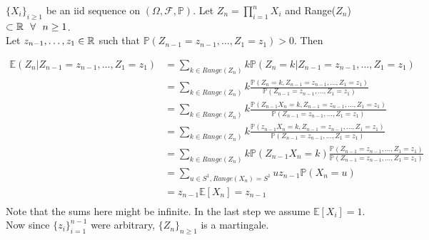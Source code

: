 \documentclass[main]{subfiles}
\begin{document}
\ex $\{X_i\}_{i \geq 1}$ be an iid sequence on $(\Omega, \mathcal{F}, \mathbb{P})$. Let
$Z_n= \prod_{i=1}^n X_i$
and Range($Z_n$) $\subset \mathbb R ~~\forall ~~ n \geq 1$. \\
Let $z_{n-1}, \ldots, z_1 \in \mathbb R$ such that $\mathbb{P} (Z_{n-1}=z_{n-1}, \ldots, Z_1=z_1)>0$. Then

\begin{align*}
  \mathbb{E} (Z_n |Z_{n-1}=z_{n-1}, \ldots, Z_1=z_1) & = \sum_{k \in Range(Z_n)} k \mathbb{P} (Z_n=k |Z_{n-1}=z_{n-1}, \ldots, Z_1=z_1)                                                                           \\
                                                     & = \sum_{k \in Range(Z_n)} k \frac{\mathbb{P} (Z_n=k ,Z_{n-1}=z_{n-1}, \ldots, Z_1=z_1)}{\mathbb{P} (Z_{n-1}=z_{n-1}, \ldots, Z_1=z_1)}                     \\
                                                     & =  \sum_{k \in Range(Z_n)} k \frac{\mathbb{P} (Z_{n-1}X_n=k ,Z_{n-1}=z_{n-1}, \ldots, Z_1=z_1)}{\mathbb{P} (Z_{n-1}=z_{n-1}, \ldots, Z_1=z_1)}             \\
                                                     & =  \sum_{k \in Range(Z_n)} k \frac{\mathbb{P} (z_{n-1}X_n=k ,Z_{n-1}=z_{n-1}, \ldots, Z_1=z_1)}{\mathbb{P} (Z_{n-1}=z_{n-1}, \ldots, Z_1=z_1)}             \\
                                                     & =  \sum_{k \in Range(Z_n)} k \mathbb{P}(Z_{n-1}X_n=k ) \frac{\mathbb{P} (Z_{n-1}=z_{n-1}, \ldots, Z_1=z_1)}{\mathbb{P} (Z_{n-1}=z_{n-1}, \ldots, Z_1=z_1)} \\
                                                     & = \sum_{u \in S^1, Range(X_n)=S^1} u z_{n-1} \mathbb{P} (X_n=u)                                                                                            \\
                                                     & = z_{n-1} \mathbb{E} [X_n] =z_{n-1}                                                                                                                        \\
\end{align*}
Note that the sums here might be infinite. In the last step we assume $\mathbb{E}[X_i]=1$. Now since $\{z_i\}_{i=1}^{n-1}$ were arbitrary, $\{Z_n\}_{n \geq 1}$ is a martingale. \\
\end{document}
